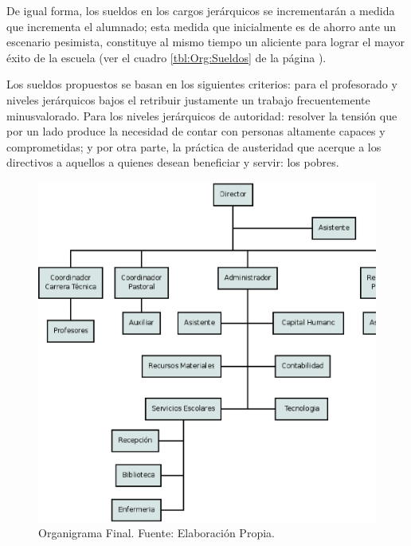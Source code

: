 De igual forma, los sueldos en los cargos jerárquicos se incrementarán a medida que incrementa el alumnado; esta medida que inicialmente es de ahorro ante un escenario pesimista, constituye al mismo tiempo un aliciente para lograr el mayor éxito de la escuela (ver el cuadro \ref{tbl:Org:Sueldos} de la página \pageref{tbl:Org:Sueldos}).

Los sueldos propuestos se basan en los siguientes criterios: para el profesorado y niveles jerárquicos bajos el retribuir justamente un trabajo frecuentemente minusvalorado. Para los niveles jerárquicos de autoridad: resolver la tensión que por un lado produce la necesidad de contar con personas altamente capaces y comprometidas; y por otra parte, la práctica de austeridad que acerque a los directivos a aquellos a quienes desean beneficiar y servir: los pobres.

\begin{figure}
	\centering
	\includegraphics[scale=0.7]{images/organigrama-final}
	\caption{Organigrama Final. Fuente: Elaboración Propia.}
	\label{fig:Org:Final}
\end{figure}

